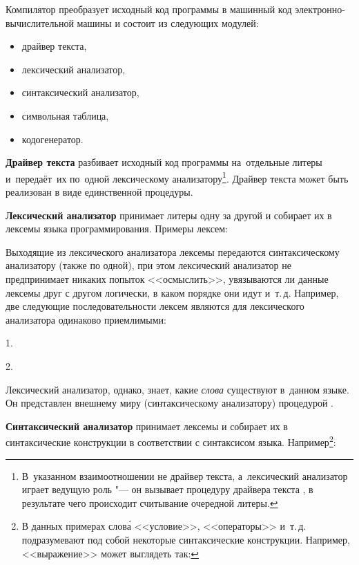 Компилятор преобразует исходный код программы в машинный код
электронно-вычислительной машины и состоит из следующих модулей:

\begin{itemize}
  \item драйвер текста,
  \item лексический анализатор,
  \item синтаксический анализатор,
  \item символьная таблица,
  \item кодогенератор.
\end{itemize}

{\bfseries Драйвер текста} разбивает исходный код программы
на~отдельные литеры и~передаёт~их по~одной лексическому
анализатору\footnote{В~указанном взаимоотношении не драйвер
текста, а~лексический анализатор играет ведущую роль "--- он
вызывает процедуру драйвера текста , в результате
чего происходит считывание очередной литеры.}. Драйвер текста
может быть реализован в виде единственной процедуры.

{\bfseries Лексический анализатор} принимает литеры одну за другой
и собирает их в лексемы языка программирования. Примеры лексем:




Выходящие из лексического анализатора лексемы передаются
синтаксическому анализатору (также по одной), при этом лексический
анализатор не предпринимает никаких попыток <<осмыслить>>,
увязываются ли данные лексемы друг с другом логически, в каком
порядке они идут и~т.\,д. Например, две следующие последовательности
лексем являются для лексического анализатора одинаково приемлимыми:

1. 

2. 

Лексический анализатор, однако, знает, какие {\em слова} существуют
в~данном языке. Он представлен внешнему миру
(синтаксическому анализатору) процедурой .

{\bfseries Синтаксический анализатор} принимает лексемы и собирает их
в синтаксические конструкции в соответствии с синтаксисом языка.
Например\footnote{В данных примерах слов\'{а}
<<условие>>, <<операторы>> и~т.\,д. подразумевают под собой некоторые
синтаксические конструкции. Например, <<выражение>> может выглядеть
так: }:

